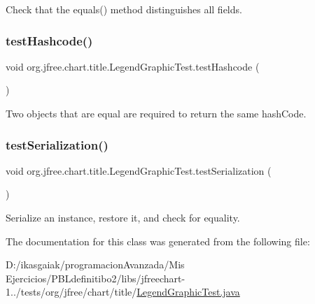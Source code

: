 Check that the equals() method distinguishes all fields. \mbox{\label{classorg_1_1jfree_1_1chart_1_1title_1_1_legend_graphic_test_a1aee772ed637842327c2da00416aa969}} 
\subsubsection{\texorpdfstring{test\+Hashcode()}{testHashcode()}}
{\footnotesize\ttfamily void org.\+jfree.\+chart.\+title.\+Legend\+Graphic\+Test.\+test\+Hashcode (\begin{DoxyParamCaption}{ }\end{DoxyParamCaption})}

Two objects that are equal are required to return the same hash\+Code. \mbox{\label{classorg_1_1jfree_1_1chart_1_1title_1_1_legend_graphic_test_ac9ffe1e3e45a1786bcaa443e1d9a0cac}} 
\subsubsection{\texorpdfstring{test\+Serialization()}{testSerialization()}}
{\footnotesize\ttfamily void org.\+jfree.\+chart.\+title.\+Legend\+Graphic\+Test.\+test\+Serialization (\begin{DoxyParamCaption}{ }\end{DoxyParamCaption})}

Serialize an instance, restore it, and check for equality. 

The documentation for this class was generated from the following file\+:\begin{DoxyCompactItemize}
\item 
D\+:/ikasgaiak/programacion\+Avanzada/\+Mis Ejercicios/\+P\+B\+Ldefinitibo2/libs/jfreechart-\/1../tests/org/jfree/chart/title/\mbox{\hyperlink{_legend_graphic_test_8java}{Legend\+Graphic\+Test.\+java}}\end{DoxyCompactItemize}
